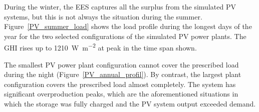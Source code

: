 During the winter, the \ac{EES} captures all the surplus from the simulated \ac{PV} systems, but this is not always the situation during the summer. Figure~\ref{PV_summer_load} shows the load profile during the longest days of the year for the two selected configurations of the simulated \ac{PV} power plants. The \ac{GHI} rises up to \SI{1210}{\watt\per\square\metre} at peak in the time span shown.


The smallest \ac{PV} power plant configuration cannot cover the prescribed load during the night (Figure~\ref{PV_annual_profil}). By contrast, the largest plant configuration covers the prescribed load almost completely. The system has significant overproduction peaks, which are the aforementioned situations in which the storage was fully charged and the \ac{PV} system output exceeded demand.  

